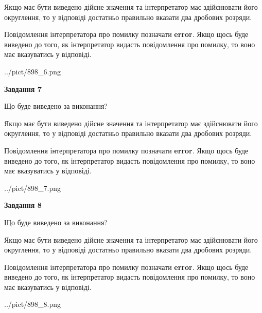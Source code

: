 \documentclass[12pt, ukrainian]{article}
\begin{document}
{\begin {Large}
Якщо має бути виведено дійсне значення та інтерпретатор має здійснювати його округлення, 
то у відповіді достатньо правильно вказати два дробових розряди.

Повідомлення інтерпретатора про помилку позначати \textbf{error}.
Якщо щось буде виведено до того, як інтерпретатор видасть повідомлення про помилку, 
то воно має вказуватись у відповіді. \par

\begin{center}
	{../pict/898_6.png}
\end{center}
\newpage

{\begin {center}\textbf{Завдання 7}\end {center}}\par
Що буде виведено за виконання? \par

Якщо має бути виведено дійсне значення та інтерпретатор має здійснювати його округлення, 
то у відповіді достатньо правильно вказати два дробових розряди.

Повідомлення інтерпретатора про помилку позначати \textbf{error}.
Якщо щось буде виведено до того, як інтерпретатор видасть повідомлення про помилку, 
то воно має вказуватись у відповіді. \par

\begin{center}
	{../pict/898_7.png}
\end{center}
\newpage

{\begin {center}\textbf{Завдання 8}\end {center}}\par
Що буде виведено за виконання? \par

Якщо має бути виведено дійсне значення та інтерпретатор має здійснювати його округлення, 
то у відповіді достатньо правильно вказати два дробових розряди.

Повідомлення інтерпретатора про помилку позначати \textbf{error}.
Якщо щось буде виведено до того, як інтерпретатор видасть повідомлення про помилку, 
то воно має вказуватись у відповіді. \par

\begin{center}
	{../pict/898_8.png}
\end{center}
\newpage


\end{Large}}
\end{document}

